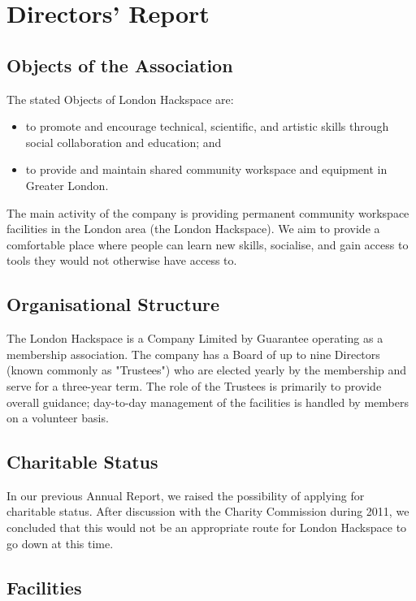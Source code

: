 \section{Directors' Report}

\subsection{Objects of the Association}

The stated Objects of London Hackspace are:

\begin{itemize}
    \item to promote and encourage technical, scientific, and artistic skills through social collaboration and education; and
    \item to provide and maintain shared community workspace and equipment in Greater London.
\end{itemize}

The main activity of the company is providing permanent community workspace facilities in the London area (the London Hackspace).
We aim to provide a comfortable place where people can learn new skills, socialise, and gain access to tools they would not otherwise have access to.

\subsection{Organisational Structure}\label{ref_structure}

The London Hackspace is a Company Limited by Guarantee operating as a membership association.
The company has a Board of up to nine Directors (known commonly as "Trustees") who are elected yearly by the membership and serve for a three-year term.
The role of the Trustees is primarily to provide overall guidance; day-to-day management of the facilities is handled by members on a volunteer basis.

\subsection{Charitable Status}

In our previous Annual Report, we raised the possibility of applying for charitable status.
After discussion with the Charity Commission during 2011, we concluded that this would not be
an appropriate route for London Hackspace to go down at this time.

\subsection{Facilities}

